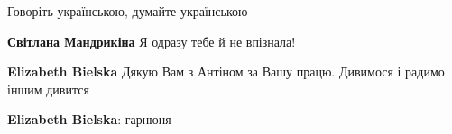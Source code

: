 \begin{itemize}
Говоріть українською, думайте українською

\begin{itemize}
 
\textbf{Світлана Мандрикіна} Я одразу тебе й не впізнала! \Smiley[1.0][yellow]

 
\textbf{Elizabeth Bielska} Дякую Вам з Антіном за Вашу працю. Дивимося і радимо іншим дивится
\end{itemize}

 
\textbf{Elizabeth Bielska}: гарнюня \Smiley[1.0][yellow]

\end{itemize}

